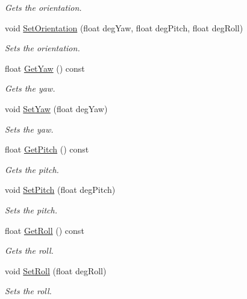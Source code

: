 \begin{DoxyCompactItemize}
\begin{DoxyCompactList}\small\item\em Gets the orientation. \end{DoxyCompactList}\item 
void \hyperlink{class_affine_transformable_a9565967f58321117e198b6925c4200d6}{Set\+Orientation} (float deg\+Yaw, float deg\+Pitch, float deg\+Roll)
\begin{DoxyCompactList}\small\item\em Sets the orientation. \end{DoxyCompactList}\item 
float \hyperlink{class_affine_transformable_afcc35bdd6301a92f87d339f386743d93}{Get\+Yaw} () const 
\begin{DoxyCompactList}\small\item\em Gets the yaw. \end{DoxyCompactList}\item 
void \hyperlink{class_affine_transformable_a47ab5b07df1ee77ae2e63dc0804c5caa}{Set\+Yaw} (float deg\+Yaw)
\begin{DoxyCompactList}\small\item\em Sets the yaw. \end{DoxyCompactList}\item 
float \hyperlink{class_affine_transformable_ae2905ed9fc069a5b237a7103538723d3}{Get\+Pitch} () const 
\begin{DoxyCompactList}\small\item\em Gets the pitch. \end{DoxyCompactList}\item 
void \hyperlink{class_affine_transformable_a8413b02e25aec2a759d5fd269d13fc02}{Set\+Pitch} (float deg\+Pitch)
\begin{DoxyCompactList}\small\item\em Sets the pitch. \end{DoxyCompactList}\item 
float \hyperlink{class_affine_transformable_a36e3c2f2b62a4a66ab960118440d186c}{Get\+Roll} () const 
\begin{DoxyCompactList}\small\item\em Gets the roll. \end{DoxyCompactList}\item 
void \hyperlink{class_affine_transformable_a9db54f563d9db087b43b64a371200264}{Set\+Roll} (float deg\+Roll)
\begin{DoxyCompactList}\small\item\em Sets the roll. \end{DoxyCompactList}\item 

\end{DoxyCompactItemize}
